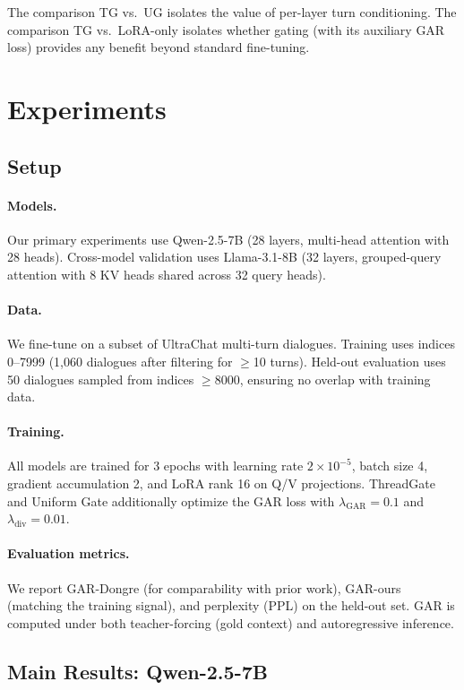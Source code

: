 \documentclass[11pt,a4paper]{article}
\begin{document}
The comparison TG vs.\ UG isolates the value of per-layer turn conditioning. The comparison TG vs.\ LoRA-only isolates whether gating (with its auxiliary GAR loss) provides any benefit beyond standard fine-tuning.

\section{Experiments}

\subsection{Setup}

\paragraph{Models.} Our primary experiments use Qwen-2.5-7B (28 layers, multi-head attention with 28 heads). Cross-model validation uses Llama-3.1-8B (32 layers, grouped-query attention with 8 KV heads shared across 32 query heads).

\paragraph{Data.} We fine-tune on a subset of UltraChat multi-turn dialogues. Training uses indices 0--7999 (1,060 dialogues after filtering for $\geq$10 turns). Held-out evaluation uses 50 dialogues sampled from indices $\geq$8000, ensuring no overlap with training data.

\paragraph{Training.} All models are trained for 3 epochs with learning rate $2 \times 10^{-5}$, batch size 4, gradient accumulation 2, and LoRA rank 16 on Q/V projections. ThreadGate and Uniform Gate additionally optimize the GAR loss with $\lambda_{\text{GAR}} = 0.1$ and $\lambda_{\text{div}} = 0.01$.

\paragraph{Evaluation metrics.} We report GAR-Dongre (for comparability with prior work), GAR-ours (matching the training signal), and perplexity (PPL) on the held-out set. GAR is computed under both teacher-forcing (gold context) and autoregressive inference.

\subsection{Main Results: Qwen-2.5-7B}
\end{document}
